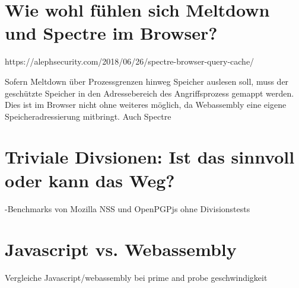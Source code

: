 \section{Wie wohl fühlen sich Meltdown und Spectre im Browser?}
\label{MeltdownSpectreBrowser}

https://alephsecurity.com/2018/06/26/spectre-browser-query-cache/
\cite{OvercomingSpectreBrowserMitigations}

Sofern Meltdown über Prozessgrenzen hinweg Speicher auslesen soll, muss der geschützte Speicher in den Adressebereich des Angriffsprozess gemappt werden.
Dies ist im Browser nicht ohne weiteres möglich, da Webassembly eine eigene Speicheradressierung mitbringt.
Auch Spectre

\section{Triviale Divsionen: Ist das sinnvoll oder kann das Weg?}

-Benchmarks von Mozilla NSS und OpenPGPjs ohne Divisionstests

\section{Javascript vs. Webassembly}

Vergleiche Javascript/webassembly bei prime and probe geschwindigkeit